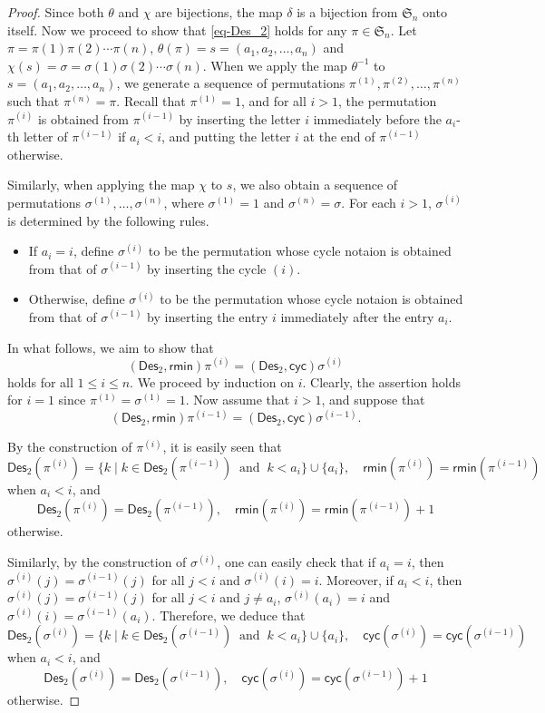 \documentclass[10pt,a4paper]{amsart}
\def\Des{\mathsf{Des}}
\def\cyc{\mathsf{cyc}}
\def\rmin{\mathsf{rmin}}
\begin{document}
     \begin{proof}
    Since both   $\theta$ and $\chi$ are bijections, the map $\delta$   is a bijection from   $\mathfrak{S}_n$ onto itself.  Now we proceed to  show that \eqref{eq-Des_2} holds for any $\pi\in \mathfrak{S}_n$. Let $\pi=\pi(1)\pi(2)\cdots\pi(n)$, $\theta(\pi)=s=(a_1,a_2,\ldots,a_n)$ and $\chi(s)=\sigma=\sigma(1)\sigma(2)\cdots\sigma(n)$. When we apply the map $\theta^{-1}$ to $s=(a_1,a_2,\ldots,a_n)$, we generate a sequence of permutations $\pi^{(1)},\pi^{(2)},\ldots,\pi^{(n)}$ such that $\pi^{(n)}=\pi$. Recall that $\pi^{(1)}=1$, and for all $i>1$, the permutation $\pi^{(i)}$ is obtained from $\pi^{(i-1)}$ by inserting the letter $i$ immediately before the $a_i$-th letter of $\pi^{(i-1)}$ if $a_i<i$, and putting the letter $i$ at the end of $\pi^{(i-1)}$ otherwise.
     
     Similarly, when applying the map $\chi$ to $s$, we also obtain a sequence of permutations $\sigma^{(1)},\ldots,\sigma^{(n)}$, where $\sigma^{(1)}=1$ and $\sigma^{(n)}=\sigma$. For  each  $i>1$,   $\sigma^{(i)}$ is determined by the following rules.
     \begin{itemize}
     	\item If $a_i = i$, define   $\sigma^{(i)}$ to be the permutation  whose cycle notaion is obtained from that  of $\sigma^{(i-1)}$ by inserting the cycle $(i)$.
     	\item Otherwise, define   $\sigma^{(i)}$ to be the permutation  whose cycle notaion is obtained from that of   $\sigma^{(i-1)}$ by  inserting  the entry $i$ immediately after the entry $a_i$. 
     \end{itemize}
     
     In what follows, we aim to show that
     \[
     (\Des_2, \rmin)\pi^{(i)}= (\Des_2, \cyc)\sigma^{(i)}
     \]
     holds for all $1\leq i\leq n$. We proceed by induction on $i$. Clearly, the assertion holds for $i=1$ since $\pi^{(1)}=\sigma^{(1)}=1$. Now assume that $i>1$, and suppose that
     \[
     (\Des_2, \rmin)\pi^{(i-1)}= (\Des_2, \cyc)\sigma^{(i-1)}.
     \]
     
     By the construction of $\pi^{(i)}$, it is easily seen that
     \[
     \Des_2(\pi^{(i)})= \{k\mid  k\in \Des_2(\pi^{(i-1)}) \;\; \mbox{and}\;\; k<a_i\}  \cup\{a_i\},\quad \rmin(\pi^{(i)})=\rmin(\pi^{(i-1)})
     \]
     when $a_i<i$, and
     \[
     \Des_2(\pi^{(i)})= \Des_2(\pi^{(i-1)}),\quad \rmin(\pi^{(i)})=\rmin(\pi^{(i-1)})+1
     \]
     otherwise.
     
     Similarly, by the construction of $\sigma^{(i)}$, one can easily check that if $a_i=i$, then $\sigma^{(i)}(j)=\sigma^{(i-1)}(j)$ for all $j<i$ and $\sigma^{(i)}(i)=i$. Moreover, if $a_i<i$, then $\sigma^{(i)}(j)=\sigma^{(i-1)}(j)$ for all $j<i$ and $j\neq a_i$, $\sigma^{(i)}(a_i)=i$ and $\sigma^{(i)}(i)=\sigma^{(i-1)}(a_i)$. Therefore, we deduce that
     \[
     \Des_2(\sigma^{(i)})= \{k\mid  k\in \Des_2(\sigma^{(i-1)})\;\; \mbox{and}\;\; k<a_i \}\cup\{a_i\},\quad \cyc(\sigma^{(i)})=\cyc(\sigma^{(i-1)})
     \]
     when $a_i<i$, and
     \[
     \Des_2(\sigma^{(i)})= \Des_2(\sigma^{(i-1)}),\quad \cyc(\sigma^{(i)})=\cyc(\sigma^{(i-1)})+1
     \]
     otherwise.
     

\end{proof}
\end{document}
